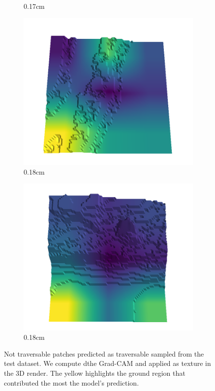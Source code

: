 \documentclass[../document.tex]{subfiles}
\begin{document}
\begin{figure}[H]
\begin{subfigure}[b]{0.192\linewidth}
    \caption{0.17cm}
    \label{fig : quarry-false_negative-18}
    \end{subfigure}
    \begin{subfigure}[b]{0.192\linewidth}
    \includegraphics[width=\linewidth]{../img/5/quarry/false_negative/17-patch-3d-majavi-colormap-180.png}
    \caption{0.18cm}
    \label{fig : quarry-false_negative-19}
    \end{subfigure}
    \begin{subfigure}[b]{0.192\linewidth}
    \includegraphics[width=\linewidth]{../img/5/quarry/false_negative/18-patch-3d-majavi-colormap-190.png}
    \caption{0.18cm}
    \label{fig : quarry-false_negative-20}
    \end{subfigure}
    \label{fig : quarry-false_negative}
    \caption{Not traversable patches predicted as traversable sampled from the test dataset. We compute dthe Grad-CAM and applied as texture in the 3D render. The yellow highlights the ground region that contributed the most the model's prediction. }
    \end{figure}
\end{document}
